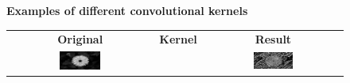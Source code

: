 \begin{description}
        \begin{figure}
            \centering
            \textbf{Examples of different convolutional kernels}\par\medskip
            \begin{tabular}{ccc}
                \textbf{Original} & \textbf{Kernel} & \textbf{Result} \\
                \includegraphics[width=0.3\textwidth]{./pictures/method/original_convolution.png} &
                \raisebox{1.2\height}{
                \begin{minipage}[b]{6cm}
                    \begin{equation*}
                        \begin{pmatrix}
                            1 & 0 & -1 \\
                            0 & 0 & 0  \\
                            -1 & 0 & 1
                        \end{pmatrix}
                    \end{equation*}
                \end{minipage}}
                    &
                \includegraphics[width=0.3\textwidth]{./pictures/method/edge_detect_convolution.png} \\


\end{tabular}
\end{figure}
\end{description}
